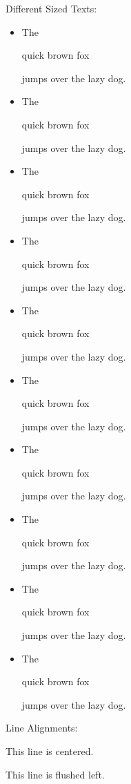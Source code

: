 \documentclass[12pt]{article}
\begin{document}
Different Sized Texts: 
\begin{itemize}
    \item The \begin{tiny}quick brown fox\end{tiny} jumps over the lazy dog. %
    \item The \begin{scriptsize}quick brown fox\end{scriptsize} jumps over the lazy dog. %
    \item The \begin{footnotesize}quick brown fox\end{footnotesize} jumps over the lazy dog. %
    \item The \begin{small}quick brown fox\end{small} jumps over the lazy dog. %
    \item The \begin{normalsize}quick brown fox\end{normalsize} jumps over the lazy dog. %
    \item The \begin{large}quick brown fox\end{large} jumps over the lazy dog. %
    \item The \begin{Large}quick brown fox\end{Large} jumps over the lazy dog. %
    \item The \begin{LARGE}quick brown fox\end{LARGE} jumps over the lazy dog. %
    \item The \begin{huge}quick brown fox\end{huge} jumps over the lazy dog. %
    \item The \begin{Huge}quick brown fox\end{Huge} jumps over the lazy dog. %
\end{itemize} \vspace{10pt}

Line Alignments: 
\begin{center}
    This line is centered. 
\end{center}

\begin{flushleft}
    This line is flushed left.
\end{flushleft}
\end{document}
